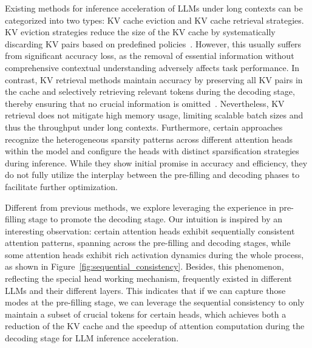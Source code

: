 Existing methods for inference acceleration of LLMs under long contexts can be categorized into two types: KV cache eviction and KV cache retrieval strategies. KV eviction strategies reduce the size of the KV cache by systematically discarding KV pairs based on predefined policies~\cite{streamingllm,h2o,snapkv,pyramidkv}. However, this usually suffers from significant accuracy loss, as the removal of essential information without comprehensive contextual understanding adversely affects task performance. In contrast, KV retrieval methods maintain accuracy by preserving all KV pairs in the cache and selectively retrieving relevant tokens during the decoding stage, thereby ensuring that no crucial information is omitted~\cite{quest,shadowkv}. Nevertheless, KV retrieval does not mitigate high memory usage, limiting scalable batch sizes and thus the throughput under long contexts. Furthermore, certain approaches~\cite{minference,duoattention,razorattention} recognize the heterogeneous sparsity patterns across different attention heads within the model and configure the heads with distinct sparsification strategies during inference.
While they show initial promise in accuracy and efficiency, they do not fully utilize the interplay between the pre-filling and decoding phases to facilitate further optimization.

Different from previous methods, we explore leveraging the experience in pre-filling stage to promote the decoding stage. Our intuition is inspired by an interesting observation: certain attention heads exhibit sequentially consistent attention patterns, spanning across the pre-filling and decoding stages, while some attention heads exhibit rich activation dynamics during the whole process, as shown in Figure~\ref{fig:sequential_consistency}.
Besides, this phenomenon, reflecting the special head working mechanism, frequently existed in different LLMs and their different layers. 
This indicates that if we can capture those modes at the pre-filling stage, we can leverage the sequential consistency to only maintain a subset of crucial tokens for certain heads, which achieves both a reduction of the KV cache and the speedup of attention computation during the decoding stage for LLM inference acceleration. 


